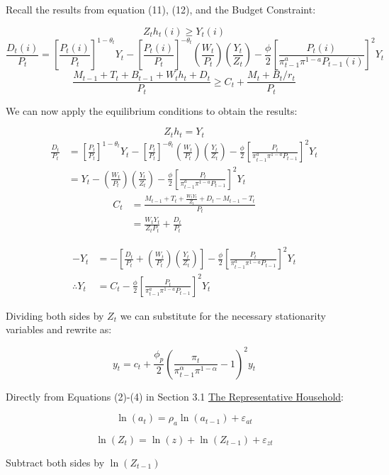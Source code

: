 \documentclass[11pt,preprint, authoryear]{elsarticle}
\numberwithin{equation}{section}
\numberwithin{figure}{section}
\numberwithin{table}{section}
\begin{document}
Recall the results from equation (11), (12), and the Budget Constraint:

\[Z_th_t(i) \ge Y_t(i) \tag{11}\]
\[\frac{D_t(i)}{P_t}=[\frac{P_t(i)}{P_t}]^{1-\theta_t}Y_t-[\frac{P_t(i)}{P_t}]^{-\theta_t}(\frac{W_t}{P_t})(\frac{Y_t}{Z_t})-\frac{\phi}{2}[\frac{P_t(i)}{\pi_{t-1}^a \pi^{1-a}P_{t-1}(i)}]^2Y_t\tag{12}\]
\[\frac{M_{t-1}+T_{t}+B_{t-1}+W_{t} h_{t}+D_{t}}{P_{t}} \geq C_{t}+\frac{M_{t}+B_{t} / r_{t}}{P_{t}}\]

We can now apply the equilibrium conditions to obtain the results:

\[Z_th_t = Y_t \]
\[\begin{aligned} \frac{D_t}{P_t} & =[\frac{P_t}{P_t}]^{1-\theta_t}Y_t - [\frac{P_t}{P_t}]^{-\theta_t}(\frac{W_t}{P_t})(\frac{Y_t}{Z_t})-\frac{\phi}{2}[\frac{P_t}{\pi_{t-1}^a \pi^{1-a}P_{t-1}}]^2Y_t \\
& = Y_t - (\frac{W_t}{P_t})(\frac{Y_t}{Z_t}) - \frac{\phi}{2}[\frac{P_t}{\pi_{t-1}^a \pi^{1-a}P_{t-1}}]^2Y_t \end{aligned}\]
\[\begin{aligned} C_{t} &= \frac{M_{t-1}+T_{t}+\frac{W_tY_t}{Z_t}+D_{t} - M_{t-1} - T_t}{P_{t}}\\
& = \frac{W_tY_t}{Z_t P_t} + \frac{D_{t}}{P_t}
\end{aligned}\]

\[\begin{aligned} -Y_t  &= -\left[ \frac{D_t}{P_t} + (\frac{W_t}{P_t})(\frac{Y_t}{Z_t}) \right] - \frac{\phi}{2}[\frac{P_t}{\pi_{t-1}^a \pi^{1-a}P_{t-1}}]^2Y_t \\
\therefore Y_t & = C_t - \frac{\phi}{2}[\frac{P_t}{\pi_{t-1}^a \pi^{1-a}P_{t-1}}]^2Y_t
\end{aligned}\]

Dividing both sides by \(Z_t\) we can substitute for the necessary
stationarity variables and rewrite as:

\[y_{t}=c_{t}+\frac{\phi_{p}}{2}\left(\frac{\pi_{t}}{\pi_{t-1}^{\alpha} \pi^{1-\alpha}}-1\right)^{2} y_{t} \tag{1*}\]

Directly from Equations (2)-(4) in Section 3.1
\protect\hyperlink{the-representative-household}{The Representative
Household}:

\[\ln \left(a_{t}\right)=\rho_{a} \ln \left(a_{t-1}\right)+\varepsilon_{a t} \tag{2*}\]

\[\ln \left(Z_{t}\right)=\ln (z) + \ln(Z_{t-1}) +\varepsilon_{z t}\]

Subtract both sides by \(\ln(Z_{t-1})\)
\end{document}
